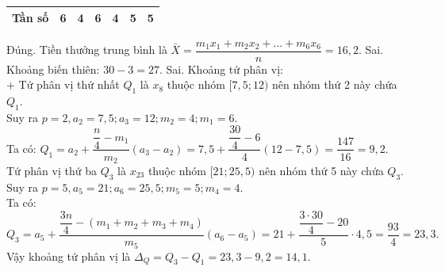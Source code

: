 \begin{ex}
{\begin{itemchoice}
\begin{center}
\begin{tabular}{|c|c|c|c|c|c|c|}
					\hline Tần số & 6 & 4 & 6 & 4 & 5 & 5 \\
					\hline
				\end{tabular}
			\end{center}
			\itemch Đúng. Tiền thưởng trung bình là $\bar{X}=\dfrac{m_1 x_1+m_2 x_2+\ldots+m_6 x_6}{n}=16{,}2$.
			\itemch Sai.  Khoảng biến thiên: $30-3=27$.%
			\itemch Sai.  Khoảng tứ phân vị:\\
			+ Tứ phân vị thứ nhất $Q_1$ là $x_8$ thuộc nhóm $[7{,}5 ; 12)$ nên nhóm thứ 2 này chứa $Q_1$.\\
			Suy ra $p=2, a_2=7{,}5 ; a_3=12 ; m_2=4 ; m_1=6$.\\
			Ta có: $Q_1=a_2+\dfrac{\dfrac{n}{4}-m_1}{m_2}\left(a_3-a_2\right)=7{,}5+\dfrac{\dfrac{30}{4}-6}{4}(12-7{,}5)=\dfrac{147}{16}=9{,}2$.\\
			Tứ phân vị thứ ba $Q_3$ là $x_{23}$ thuộc nhóm $[21 ; 25{,}5)$ nên nhóm thứ 5 này chứa $Q_3$.\\
			Suy ra $p=5, a_5=21 ; a_6=25{,}5 ; m_5=5 ; m_4=4$.\\
			Ta có: $$Q_3=a_5+\dfrac{\dfrac{3 n}{4}-\left(m_1+m_2+m_3+m_4\right)}{m_5}\left(a_6-a_5\right)=21+\dfrac{\dfrac{3 \cdot 30}{4}-20}{5} \cdot 4{,}5=\frac{93}{4}=23{,}3.$$
			Vậy khoảng tứ phân vị là $\Delta_Q=Q_3-Q_1=23,3-9,2=14,1$.
		\end{itemchoice}
	}
\end{ex}


